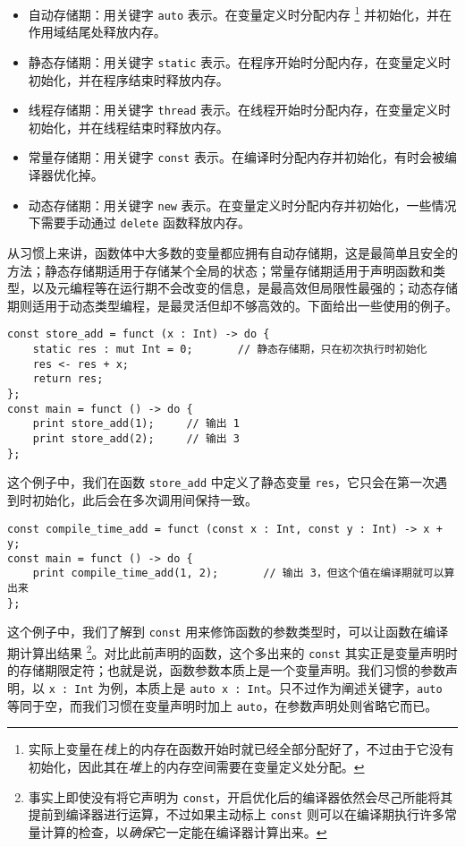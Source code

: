 \begin{itemize}
    \item 自动存储期：用关键字 \lstinline!auto! 表示。在变量定义时分配内存 \footnote{实际上变量在\emph{栈}上的内存在函数开始时就已经全部分配好了，不过由于它没有初始化，因此其在\emph{堆}上的内存空间需要在变量定义处分配。} 并初始化，并在作用域结尾处释放内存。

    \item 静态存储期：用关键字 \lstinline!static! 表示。在程序开始时分配内存，在变量定义时初始化，并在程序结束时释放内存。
    
    \item 线程存储期：用关键字 \lstinline!thread! 表示。在线程开始时分配内存，在变量定义时初始化，并在线程结束时释放内存。

    \item 常量存储期：用关键字 \lstinline!const! 表示。在编译时分配内存并初始化，有时会被编译器优化掉。

    \item 动态存储期：用关键字 \lstinline!new! 表示。在变量定义时分配内存并初始化，一些情况下需要手动通过 \lstinline!delete! 函数释放内存。
\end{itemize}

从习惯上来讲，函数体中大多数的变量都应拥有自动存储期，这是最简单且安全的方法；静态存储期适用于存储某个全局的状态；常量存储期适用于声明函数和类型，以及元编程等在运行期不会改变的信息，是最高效但局限性最强的；动态存储期则适用于动态类型编程，是最灵活但却不够高效的。下面给出一些使用的例子。

\begin{lstlisting}
const store_add = funct (x : Int) -> do {
    static res : mut Int = 0;		// 静态存储期，只在初次执行时初始化
    res <- res + x;
    return res;
};
const main = funct () -> do {
    print store_add(1);     // 输出 1
    print store_add(2);     // 输出 3
};
\end{lstlisting}

这个例子中，我们在函数 \lstinline!store_add! 中定义了静态变量 \lstinline!res!，它只会在第一次遇到时初始化，此后会在多次调用间保持一致。

\begin{lstlisting}
const compile_time_add = funct (const x : Int, const y : Int) -> x + y;
const main = funct () -> do {
    print compile_time_add(1, 2);       // 输出 3，但这个值在编译期就可以算出来
};
\end{lstlisting}

这个例子中，我们了解到 \lstinline!const! 用来修饰函数的参数类型时，可以让函数在编译期计算出结果 \footnote{事实上即使没有将它声明为 \lstinline!const!，开启优化后的编译器依然会尽己所能将其提前到编译器进行运算，不过如果主动标上 \lstinline!const! 则可以在编译期执行许多常量计算的检查，以\emph{确保}它一定能在编译器计算出来。}。对比此前声明的函数，这个多出来的 \lstinline!const! 其实正是变量声明时的存储期限定符；也就是说，函数参数本质上是一个变量声明。我们习惯的参数声明，以 \lstinline!x : Int! 为例，本质上是 \lstinline!auto x : Int!。只不过作为阐述关键字，\lstinline!auto! 等同于空，而我们习惯在变量声明时加上 \lstinline!auto!，在参数声明处则省略它而已。


